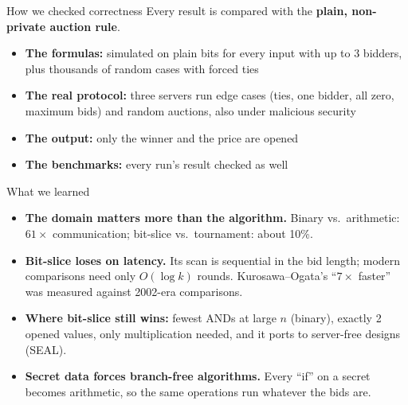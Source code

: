 \documentclass[aspectratio=169,11pt]{beamer}
\begin{document}
\begin{frame}{How we checked correctness}
  Every result is compared with the \textbf{plain, non-private auction rule}.
  \begin{itemize}
    \item \textbf{The formulas:} simulated on plain bits for every input with up to 3 bidders,
          plus thousands of random cases with forced ties
    \item \textbf{The real protocol:} three servers run edge cases (ties, one bidder, all zero,
          maximum bids) and random auctions, also under malicious security
    \item \textbf{The output:} only the winner and the price are opened
    \item \textbf{The benchmarks:} every run's result checked as well
  \end{itemize}
\end{frame}

\begin{frame}{What we learned}
  \begin{itemize}
    \item \textbf{The domain matters more than the algorithm.}
          Binary vs.\ arithmetic: $61\times$ communication; bit-slice vs.\ tournament: about 10\%.
    \item \textbf{Bit-slice loses on latency.} Its scan is sequential in the bid length; modern
          comparisons need only $O(\log k)$ rounds. Kurosawa--Ogata's ``$7\times$ faster'' was
          measured against 2002-era comparisons.
    \item \textbf{Where bit-slice still wins:} fewest ANDs at large $n$ (binary), exactly 2
          opened values, only multiplication needed, and it ports to server-free designs (SEAL).
    \item \textbf{Secret data forces branch-free algorithms.} Every ``if'' on a secret becomes
          arithmetic, so the same operations run whatever the bids are.
  \end{itemize}
\end{frame}
\end{document}
